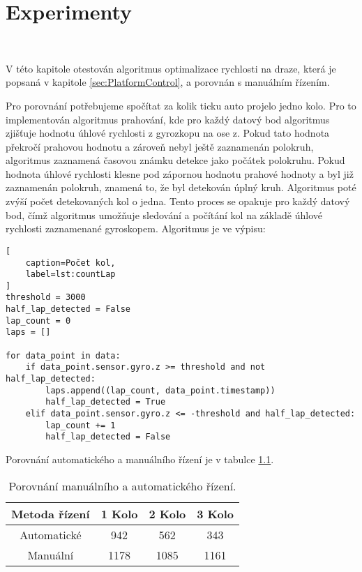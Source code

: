 \chapter{Experimenty}
\label{sec:Experiments}
\vspace{-20pt}
\

V této kapitole otestován algoritmus optimalizace rychlosti na draze,
která je popsaná v kapitole \ref{sec:PlatformControl}, a porovnán s manuálním
řízením.

Pro porovnání potřebujeme spočítat za kolik ticku auto projelo jedno kolo. Pro
to implementován algoritmus prahování, kde pro každý datový bod algoritmus zjišťuje hodnotu
úhlové rychlosti z gyrozkopu na ose z. Pokud tato hodnota překročí prahovou hodnotu a
zároveň nebyl ještě zaznamenán polokruh, algoritmus zaznamená časovou známku detekce jako
počátek polokruhu. Pokud hodnota úhlové rychlosti klesne pod zápornou hodnotu prahové
hodnoty a byl již zaznamenán polokruh, znamená to, že byl detekován úplný kruh. Algoritmus
poté zvýší počet detekovaných kol o jedna.
Tento proces se opakuje pro každý datový bod, čímž algoritmus umožňuje sledování a počítání
kol na základě úhlové rychlosti zaznamenané gyroskopem.
Algoritmus je ve výpisu:
\begin{lstlisting}[
	caption=Počet kol,
	label=lst:countLap
]
threshold = 3000
half_lap_detected = False
lap_count = 0
laps = []

for data_point in data:
    if data_point.sensor.gyro.z >= threshold and not half_lap_detected:
        laps.append((lap_count, data_point.timestamp))
        half_lap_detected = True
    elif data_point.sensor.gyro.z <= -threshold and half_lap_detected:
        lap_count += 1
        half_lap_detected = False
\end{lstlisting}

Porovnání automatického a manuálního řízení je v tabulce \ref{tab:Comparison}.
\begin{table}[!h]
    \centering
    \begin{tabular}{cccc}
        \hline
        \textbf{Metoda řízení} & \textbf{1 Kolo} & \textbf{2 Kolo} & \textbf{3 Kolo} \\
        \hline
        Automatické           & 942       & 562 & 343          \\
        Manuální 			  & 1178       & 1085 & 1161           \\
        \hline
    \end{tabular}
    \caption{Porovnání manuálního a automatického řízení.}
    \label{tab:Comparison}
\end{table}
\endinput
